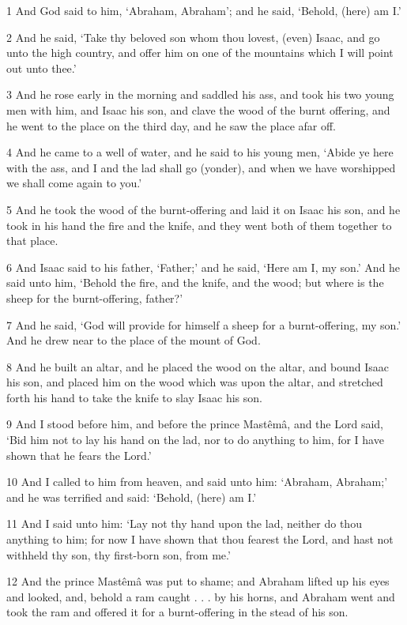 \par 1 And God said to him, ‘Abraham, Abraham’; and he said, ‘Behold, (here) am I.’
\par 2 And he said, ‘Take thy beloved son whom thou lovest, (even) Isaac, and go unto the high country, and offer him on one of the mountains which I will point out unto thee.’
\par 3 And he rose early in the morning and saddled his ass, and took his two young men with him, and Isaac his son, and clave the wood of the burnt offering, and he went to the place on the third day, and he saw the place afar off.
\par 4 And he came to a well of water, and he said to his young men, ‘Abide ye here with the ass, and I and the lad shall go (yonder), and when we have worshipped we shall come again to you.’
\par 5 And he took the wood of the burnt-offering and laid it on Isaac his son, and he took in his hand the fire and the knife, and they went both of them together to that place.
\par 6 And Isaac said to his father, ‘Father;’ and he said, ‘Here am I, my son.’ And he said unto him, ‘Behold the fire, and the knife, and the wood; but where is the sheep for the burnt-offering, father?’
\par 7 And he said, ‘God will provide for himself a sheep for a burnt-offering, my son.’ And he drew near to the place of the mount of God.
\par 8 And he built an altar, and he placed the wood on the altar, and bound Isaac his son, and placed him on the wood which was upon the altar, and stretched forth his hand to take the knife to slay Isaac his son.
\par 9 And I stood before him, and before the prince Mastêmâ, and the Lord said, ‘Bid him not to lay his hand on the lad, nor to do anything to him, for I have shown that he fears the Lord.’
\par 10 And I called to him from heaven, and said unto him: ‘Abraham, Abraham;’ and he was terrified and said: ‘Behold, (here) am I.’
\par 11 And I said unto him: ‘Lay not thy hand upon the lad, neither do thou anything to him; for now I have shown that thou fearest the Lord, and hast not withheld thy son, thy first-born son, from me.’
\par 12 And the prince Mastêmâ was put to shame; and Abraham lifted up his eyes and looked, and, behold a ram caught . . . by his horns, and Abraham went and took the ram and offered it for a burnt-offering in the stead of his son.
